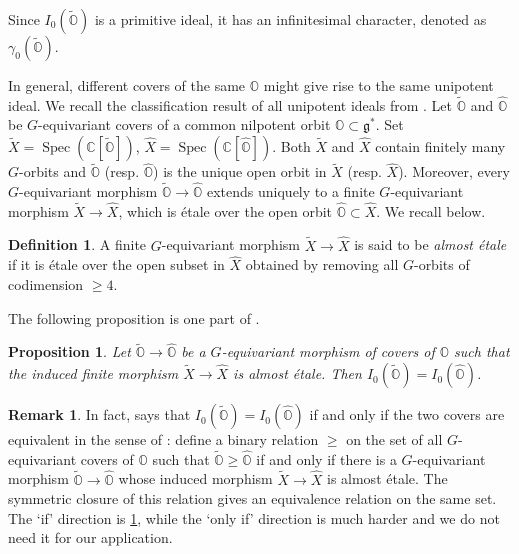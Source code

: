 \documentclass[11pt, a4paper]{amsart}
\newcommand{\C}{\mathbb{C}}
\newcommand{\orb}{\mathbb{O}}
\newcommand{\fg}{\mathfrak{g}}
\newcommand{\spec}{\operatorname{Spec}}
\newtheorem{Prop}[Thm]{Proposition}
\theoremstyle{definition}
\newtheorem{defi}[Thm]{Definition}
\newtheorem{Rem}[Thm]{Remark}
\numberwithin{equation}{section}
\begin{document}
Since $I_0(\widetilde{\orb})$ is a primitive ideal, it has an infinitesimal character, denoted as $\gamma_0(\widetilde{\orb})$.

In general, different covers of the same $\orb$ might give rise to the same unipotent ideal. We recall the classification result of all unipotent ideals from \cite{LMBM}. Let $\widetilde{\orb}$ and $\widehat{\orb}$ be $G$-equivariant covers of a common nilpotent orbit $\orb \subset \fg^*$. Set $\widetilde{X} = \spec(\C[\widetilde{\orb}])$, $\widehat{X} = \spec(\C[\widehat{\orb}])$.
Both $\widetilde{X}$ and $\widehat{X}$ contain finitely many $G$-orbits and $\widetilde{\orb}$ (resp. $\widehat{\orb}$) is the unique open orbit in $\widetilde{X}$ (resp. $\widehat{X}$). Moreover, every $G$-equivariant morphism $\widetilde{\orb} \to \widehat{\orb}$ extends uniquely to a finite $G$-equivariant morphism $\widetilde{X} \to \widehat{X}$, which is \'{e}tale over the open orbit $\widehat{\orb} \subset \widehat{X}$. We recall \cite[Definition 1.5.2]{LMBM} below.

\begin{defi} \label{defi:almost_etale}
A finite $G$-equivariant morphism $\widetilde{X} \rightarrow \widehat{X}$ is said to be \emph{almost \'{e}tale} if it is \'{e}tale over the open subset in $\widehat{X}$ obtained by removing all $G$-orbits of codimension $\geqslant 4$. 
\end{defi}

The following proposition is one part of \cite[Proposition 6.2.8]{LMBM}.

\begin{Prop} \label{prop:almost_etale_unip_ideal}
    Let $\widetilde{\orb} \to \widehat{\orb}$ be a $G$-equivariant morphism of covers of $\orb$ such that the induced finite morphism $\widetilde{X} \to \widehat{X}$ is almost \'{e}tale. Then $I_0(\widetilde{\orb}) = I_0(\widehat{\orb})$.
\end{Prop}

\begin{Rem} \label{rem:equiv_covers}
	In fact, \cite[Proposition 6.2.8]{LMBM} says that $I_0(\widetilde{\orb}) = I_0(\widehat{\orb})$ if and only if the two covers are equivalent in the sense of \cite[Definition 6.25]{LMBM}: define a binary relation $\ge$ on the set of all $G$-equivariant covers of $\orb$ such that $\widetilde{\orb} \ge \widehat{\orb}$ if and only if there is a $G$-equivariant morphism $\widetilde{\orb} \to \widehat{\orb}$ whose induced morphism $\widetilde{X} \rightarrow \widehat{X}$ is almost \'{e}tale. The symmetric closure of this relation gives an equivalence relation on the same set. The `if' direction is \cref{prop:almost_etale_unip_ideal}, while the `only if' direction is much harder and we do not need it for our application.
\end{Rem}
\end{document}
